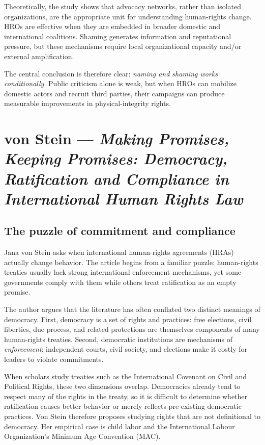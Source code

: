 Theoretically, the study shows that advocacy networks, rather than isolated organizations, are the appropriate unit for understanding human-rights change. HROs are effective when they are embedded in broader domestic and international coalitions. Shaming generates information and reputational pressure, but these mechanisms require local organizational capacity and/or external amplification.

The central conclusion is therefore clear: \textit{naming and shaming works conditionally}. Public criticism alone is weak, but when HROs can mobilize domestic actors and recruit third parties, their campaigns can produce measurable improvements in physical-integrity rights.


\clearpage
\section{von Stein --- \textit{Making Promises, Keeping Promises: Democracy, Ratification and Compliance in International Human Rights Law}}

\subsection{The puzzle of commitment and compliance}

Jana von Stein asks when international human-rights agreements (HRAs) actually change behavior. The article begins from a familiar puzzle: human-rights treaties usually lack strong international enforcement mechanisms, yet some governments comply with them while others treat ratification as an empty promise.

The author argues that the literature has often conflated two distinct meanings of democracy. First, democracy is a set of rights and practices: free elections, civil liberties, due process, and related protections are themselves components of many human-rights treaties. Second, democratic institutions are mechanisms of \textit{enforcement}: independent courts, civil society, and elections make it costly for leaders to violate commitments.

When scholars study treaties such as the International Covenant on Civil and Political Rights, these two dimensions overlap. Democracies already tend to respect many of the rights in the treaty, so it is difficult to determine whether ratification causes better behavior or merely reflects pre-existing democratic practices. Von Stein therefore proposes studying rights that are not definitional to democracy. Her empirical case is child labor and the International Labour Organization's Minimum Age Convention (MAC).

